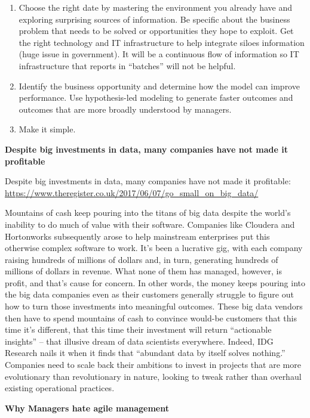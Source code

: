 \documentclass[]{book}
\providecommand{\tightlist}{%
  \setlength{\itemsep}{0pt}\setlength{\parskip}{0pt}}
\theoremstyle{definition}
\theoremstyle{definition}
\theoremstyle{definition}
\theoremstyle{remark}
\begin{document}
\begin{enumerate}
\def\labelenumi{\arabic{enumi}.}
\tightlist
\item
  Choose the right date by mastering the environment you already have
  and exploring surprising sources of information. Be specific about the
  business problem that needs to be solved or opportunities they hope to
  exploit. Get the right technology and IT infrastructure to help
  integrate siloes information (huge issue in government). It will be a
  continuous flow of information so IT infrastructure that reports in
  ``batches'' will not be helpful.
\item
  Identify the business opportunity and determine how the model can
  improve performance. Use hypothesis-led modeling to generate faster
  outcomes and outcomes that are more broadly understood by managers.
\item
  Make it simple.
\end{enumerate}

\textbf{Despite big investments in data, many companies have not made it
profitable}

Despite big investments in data, many companies have not made it
profitable:
\url{https://www.theregister.co.uk/2017/06/07/go_small_on_big_data/}

Mountains of cash keep pouring into the titans of big data despite the
world's inability to do much of value with their software. Companies
like Cloudera and Hortonworks subsequently arose to help mainstream
enterprises put this otherwise complex software to work. It's been a
lucrative gig, with each company raising hundreds of millions of dollars
and, in turn, generating hundreds of millions of dollars in revenue.
What none of them has managed, however, is profit, and that's cause for
concern. In other words, the money keeps pouring into the big data
companies even as their customers generally struggle to figure out how
to turn those investments into meaningful outcomes. These big data
vendors then have to spend mountains of cash to convince would-be
customers that this time it's different, that this time their investment
will return ``actionable insights'' -- that illusive dream of data
scientists everywhere. Indeed, IDG Research nails it when it finds that
``abundant data by itself solves nothing.'' Companies need to scale back
their ambitions to invest in projects that are more evolutionary than
revolutionary in nature, looking to tweak rather than overhaul existing
operational practices.

\textbf{Why Managers hate agile management}
\end{document}

